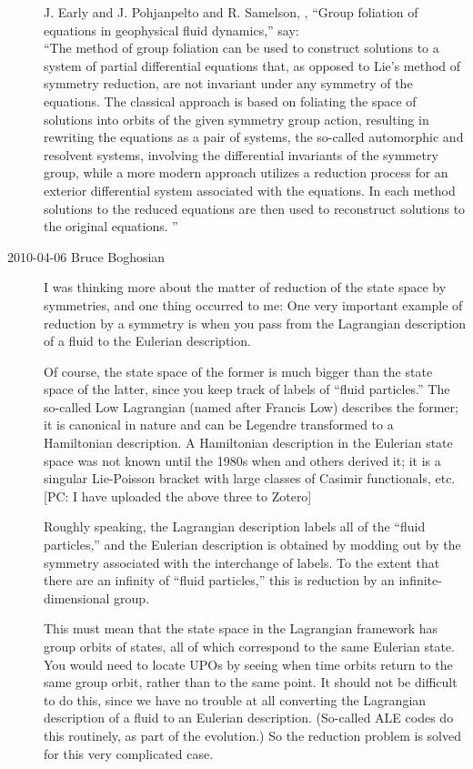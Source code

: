 \begin{description}
J. Early and J. Pohjanpelto and R. Samelson,
,
{``Group foliation of equations in geophysical fluid dynamics,''}
say:\\
``The method of group foliation can be used to construct solutions
to a system of partial differential equations that, as opposed to Lie's method of
symmetry reduction, are not invariant under any symmetry of the equations.
The classical approach is based on foliating the space of solutions into orbits
of the given symmetry group action, resulting in rewriting the equations as a
pair of systems, the so-called automorphic and resolvent systems, involving the
differential invariants of the symmetry group, while a more modern approach
utilizes a reduction process for an exterior differential system associated with
the equations. In each method solutions to the reduced equations are then used
to reconstruct solutions to the original equations.
''

\item[2010-04-06 Bruce Boghosian] %

I was thinking more about the matter of reduction of the
state space by symmetries, and one thing occurred to me:  One
very important example of reduction by a symmetry is when you
pass from the Lagrangian description of a fluid to the
Eulerian description.

Of course, the state space of the former is much bigger than
the state space of the latter, since you keep track of labels
of ``fluid particles.''
													\toCB
The so-called Low Lagrangian (named
after Francis Low) describes the former; it is canonical in
nature and can be Legendre transformed to a Hamiltonian
description.  A Hamiltonian description in the Eulerian state
space was not known until the 1980s when
 and
others derived it; it is a singular Lie-Poisson bracket with
large classes of Casimir functionals, etc.
[PC: I have uploaded the above three 
to Zotero]

Roughly speaking, the Lagrangian description labels all of
the ``fluid particles,'' and the Eulerian description is
obtained by modding out by the symmetry associated with the
interchange of labels.  To the extent that there are an
infinity of ``fluid particles,'' this is reduction by an
infinite-dimensional group.

This must mean that the state space in the Lagrangian
framework has group orbits of states, all of which correspond
to the same Eulerian state.  You would need to locate UPOs by
seeing when time orbits return to the same group orbit,
rather than to the same point.  It should not be difficult to
do this, since we have no trouble at all converting the
Lagrangian description of a fluid to an Eulerian description.
(So-called ALE codes do this routinely, as part of the
evolution.)  So the reduction problem is solved for this very
complicated case.


\end{description}
